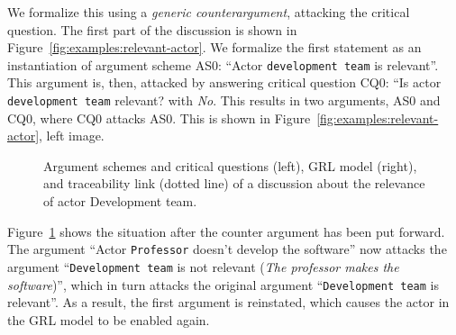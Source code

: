 We formalize this using a \emph{generic counterargument}, attacking the critical question. The first part of the discussion is shown in Figure~\ref{fig:examples:relevant-actor}. We formalize the first statement as an instantiation of argument scheme AS0: ``Actor \texttt{development team} is relevant''. This argument is, then, attacked by answering critical question CQ0: ``Is actor \texttt{development team} relevant? with \emph{No}. This results in two arguments, AS0 and CQ0, where CQ0 attacks AS0. This is shown in Figure~\ref{fig:examples:relevant-actor}, left image.

\begin{figure}[ht!]
\centering
\caption{Argument schemes and critical questions (left), GRL model (right), and traceability link (dotted line) of a discussion about the relevance of actor Development team.}
\label{fig:examples:relevant-actor2}
\end{figure}

Figure~\ref{fig:examples:relevant-actor2} shows the situation after the counter argument has been put forward. The argument ``Actor \texttt{Professor} doesn't develop the software'' now attacks the argument ``\texttt{Development team} is not relevant (\emph{The professor makes the software})'', which in turn attacks the original argument ``\texttt{Development team} is relevant''. As a result, the first argument is reinstated, which causes the actor in the GRL model to be enabled again.